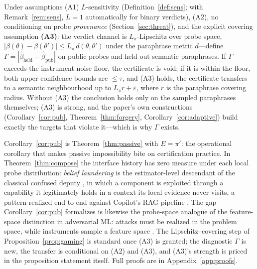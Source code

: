\begin{proposition}\label{prop:gaming}
Under assumptions (A1) $L$-sensitivity (Definition~\ref{def:sens}; with
Remark~\ref{rem:sens}, $L=1$ automatically for binary verdicts), (A2), no
conditioning on probe \emph{provenance} (Section~\ref{sec:threat}), and the
explicit covering assumption \textbf{(A3)}: the verdict channel is
$L_{\pi}$-Lipschitz over probe space,
$|\beta(\theta)-\beta(\theta')|\le L_{\pi}\,d(\theta,\theta')$ under the
paraphrase metric $d$---define
$\Gamma=|\hat\beta_{\mathrm{held}}-\hat\beta_{\mathrm{pub}}|$ on public
probes and held-out semantic paraphrases. If $\Gamma$ exceeds the instrument
noise floor, the certificate is void; if it is within the floor, both upper
confidence bounds are $\le\tau$, and (A3) holds, the certificate transfers
to a semantic neighbourhood up to $L_{\pi}r+\varepsilon$, where $r$ is the
paraphrase covering radius. Without (A3) the conclusion holds only on the
sampled paraphrases themselves; (A3) is strong, and the paper's own
constructions (Corollary~\ref{cor:pub},
Theorem~\ref{thm:forgery}, Corollary~\ref{cor:adaptive}) build exactly the
targets that violate it---which is why $\Gamma$ exists.
\end{proposition}

Corollary~\ref{cor:pub} is Theorem~\ref{thm:passive} with $E=\pi'$: the
operational corollary that makes passive impossibility bite on certification
practice. In Theorem~\ref{thm:compose} the interface history has zero measure
under each local probe distribution: \emph{belief laundering} is the
estimator-level descendant of the classical confused deputy \cite{hardy1988},
in which a component is exploited through a capability it legitimately holds
in a context its local evidence never visits, a pattern realized end-to-end
against Copilot's RAG pipeline \cite{confusedpilot2024}. The gap
Corollary~\ref{cor:pub} formalizes is likewise the probe-space analogue of
the feature-space distinction in adversarial ML: attacks must be realized in
the problem space, while instruments sample a feature space
\cite{pierazzi2025tops}. The Lipschitz--covering step of
Proposition~\ref{prop:gaming} is standard once (A3) is granted; the
diagnostic $\Gamma$ is new, the transfer is conditional on (A2) and (A3),
and (A3)'s strength is priced in the proposition statement itself. Full
proofs are in Appendix~\ref{app:proofs}.

